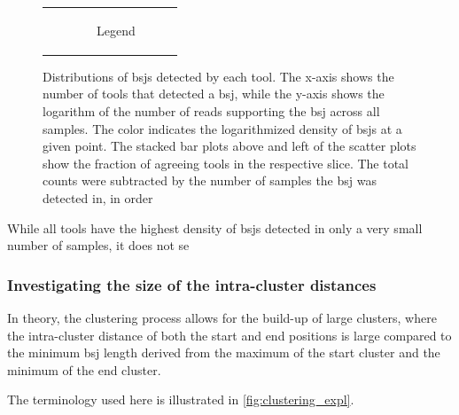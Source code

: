 \begin{figure}[ht]
\begin{tabular}{cc}
                                                                                                                          &
        \begin{subfigure}{.4\textwidth} \centering \caption{Legend}
        \end{subfigure}
    \end{tabular} \caption{Distributions of \gls{bsj}s detected by each tool.
        The x-axis shows the number of tools that detected a \gls{bsj}, while the
        y-axis shows the logarithm of the number of reads supporting the \gls{bsj}
        across all samples.
        The color indicates the logarithmized density of \gls{bsj}s at a given point.
        The stacked bar plots above and left of the scatter plots show the fraction of
        agreeing tools in the respective slice.
        The total counts were subtracted by the number of samples the \gls{bsj} was
        detected in, in order } \label{fig:detection_density} \end{figure}

\noindent{} 

While all tools have the highest density of \gls{bsj}s detected in only a very
small number of samples, it does not se 

\subsubsection{Investigating the size of the intra-cluster distances}

In theory, the clustering process allows for the build-up of large clusters,
where the intra-cluster distance of both the start and end positions is large
compared to the minimum \gls{bsj} length derived from the maximum of the start
cluster and the minimum of the end cluster.

The terminology used here is illustrated in \cref{fig:clustering_expl}.

